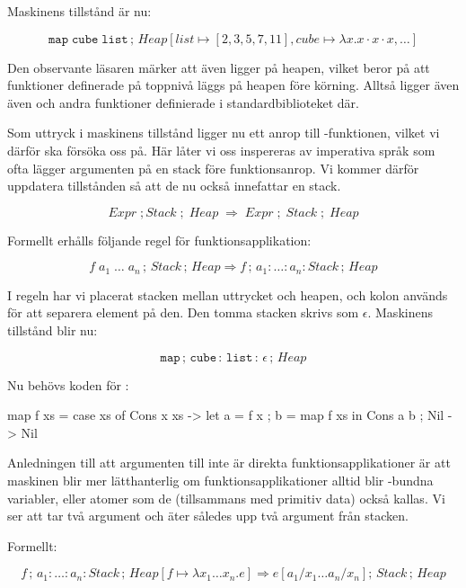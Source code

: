 \documentclass[../Core]{subfiles}
\begin{document}
Maskinens tillstånd är nu:

\[
\mathtt{map\; cube\; list}\,;\, Heap[list\mapsto[2,3,5,7,11],cube\mapsto\lambda x.x\cdot x\cdot x,\ldots]\]


Den observante läsaren märker att även  ligger på heapen, vilket
beror på att funktioner definerade på toppnivå läggs på heapen före körning.
Alltså ligger även även  och andra funktioner definierade
i standardbiblioteket där.

Som uttryck i maskinens tillstånd ligger nu ett anrop till
-funktionen, vilket vi därför ska försöka oss på.
Här låter vi oss inspereras av imperativa språk som ofta lägger argumenten
på en stack före funktionsanrop. Vi kommer därför uppdatera tillstånden så att de
nu också innefattar en stack.

\begin{equation*} 
Expr \; ; Stack \; ; \; Heap \; \Rightarrow \; Expr \; ; \; Stack \; ; \; Heap
\end{equation*} 


Formellt erhålls följande regel för funktionsapplikation:

\[
f\; a_{1}\;\ldots\; a_{n}\,;\, Stack\,;\, Heap\Rightarrow f\,;\, a_{1}:\ldots:a_{n}:Stack\,;\, Heap\]


I regeln har vi placerat stacken mellan uttrycket och heapen, och kolon används
för att separera element på den. Den tomma stacken skrivs som $\epsilon$.
Maskinens tillstånd blir nu:

\[
\mathtt{map\,\mathrm{;}\, cube\,:\, list\,:\,\epsilon}\,;\, Heap\]


Nu behövs koden för :


\begin{codeEx}
map f xs = case xs of
    { Cons x xs -> let { a = f x
                       ; b = map f xs
                       } in Cons a b
    ; Nil       -> Nil
    }
\end{codeEx}

Anledningen till att argumenten till  inte är direkta funktionsapplikationer
är att maskinen blir mer lätthanterlig om funktionsapplikationer alltid
blir -bundna variabler, eller atomer som de (tillsammans med primitiv data)
också kallas. Vi ser att  tar två argument och äter således upp två
argument från stacken.

Formellt:

\[
f\,;\, a_{1}:\ldots:a_{n}:Stack\,;\, Heap[f\mapsto\lambda x_{1}\ldots x_{n}.e]\Rightarrow e[a{}_{1}/x_{1}\ldots a_{n}/x_{n}];\, Stack\,;\, Heap\]
\end{document}
